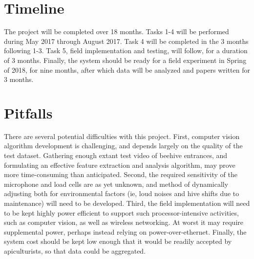 \section{Timeline}

The project will be completed over 18 months. Tasks 1-4 will be performed during May 2017 through August 2017. Task 4 will be completed in the 3 months following 1-3. Task 5, field implementation and testing, will follow, for a duration of 3 months. Finally, the system should be ready for a field experiment in Spring of 2018, for nine months, after which data will be analyzed and papers written for 3 months.
\section{Pitfalls}

There are several potential difficulties with this project. First, computer vision algorithm development is challenging, and depends largely on the quality of the test dataset. Gathering enough extant test video of beehive entrances, and formulating an effective feature extraction and analysis algorithm, may prove more time-consuming than anticipated. Second, the required sensitivity of the microphone and load cells are as yet unknown, and method of dynamically adjusting both for environmental factors (ie, loud noises and hive shifts due to maintenance) will need to be developed. Third, the field implementation will need to be kept highly power efficient to support such processor-intensive activities, such as computer vision, as well as wireless networking. At worst it may require  supplemental power, perhaps instead relying on power-over-ethernet. Finally, the system cost should be kept low enough that it would be readily accepted by apiculturists, so that data could be aggregated.
